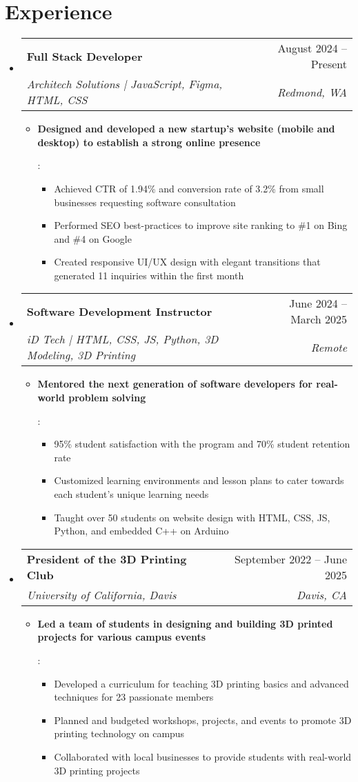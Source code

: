 \documentclass[letterpaper,11pt]{article}
\makeatletter
\newcommand{\resumeItem}[2]{
  \item\small{
    \textbf{#1}{: #2 \vspace{-2pt}}
  }
}
\newcommand{\resumeSubheading}[4]{
  \vspace{-1pt}\item
    \begin{tabular*}{0.97\textwidth}[t]{l@{\extracolsep{\fill}}r}
      \textbf{#1} & #2 \\
      \textit{\small#3} & \textit{\small #4} \\
    \end{tabular*}\vspace{-5pt}
}
\newcommand{\resumeSubHeadingListStart}{\begin{itemize}[leftmargin=*]}
\newcommand{\resumeSubHeadingListEnd}{\end{itemize}}
\newcommand{\resumeItemListStart}{\begin{itemize}}
\newcommand{\resumeItemListEnd}{\end{itemize}\vspace{-5pt}}
\makeatother
\begin{document}
\section{Experience}
    \resumeSubHeadingListStart
        \resumeSubheading
            {Full Stack Developer}{August 2024 -- Present}
            {Architech Solutions | JavaScript, Figma, HTML, CSS}{Redmond, WA}
            \resumeItemListStart
                \resumeItem{Designed and developed a new startup's website (mobile and desktop) to establish a strong online presence}
                {
                    \begin{itemize}
                    \item Achieved CTR of 1.94\% and conversion rate of 3.2\% from small businesses requesting software consultation
                    \item Performed SEO best-practices to improve site ranking to \#1 on Bing and \#4 on Google
                    \item Created responsive UI/UX design with elegant transitions that generated 11 inquiries within the first month
                    \end{itemize}
                }
            \resumeItemListEnd
    \resumeSubheading
        {Software Development Instructor}{June 2024 -- March 2025}
        {iD Tech | HTML, CSS, JS, Python, 3D Modeling, 3D Printing}{Remote}
        \resumeItemListStart
        \resumeItem{Mentored the next generation of software developers for real-world problem solving}
        {
            \begin{itemize}
            \item 95\% student satisfaction with the program and 70\% student retention rate 
            \item Customized learning environments and lesson plans to cater towards each student's unique learning needs
            \item Taught over 50 students on website design with HTML, CSS, JS, Python, and embedded C++ on Arduino
            \end{itemize}
        }
        \resumeItemListEnd
        \resumeSubheading
            {President of the 3D Printing Club}{September 2022 -- June 2025}
            {University of California, Davis}{Davis, CA}
            \resumeItemListStart
                \resumeItem{Led a team of students in designing and building 3D printed projects for various campus events}
                {
                    \begin{itemize}
                    \item Developed a curriculum for teaching 3D printing basics and advanced techniques for 23 passionate members
                    \item Planned and budgeted workshops, projects, and events to promote 3D printing technology on campus
                    \item Collaborated with local businesses to provide students with real-world 3D printing projects
                    \end{itemize}
                }
            \resumeItemListEnd
        \resumeSubHeadingListEnd
\end{document}
